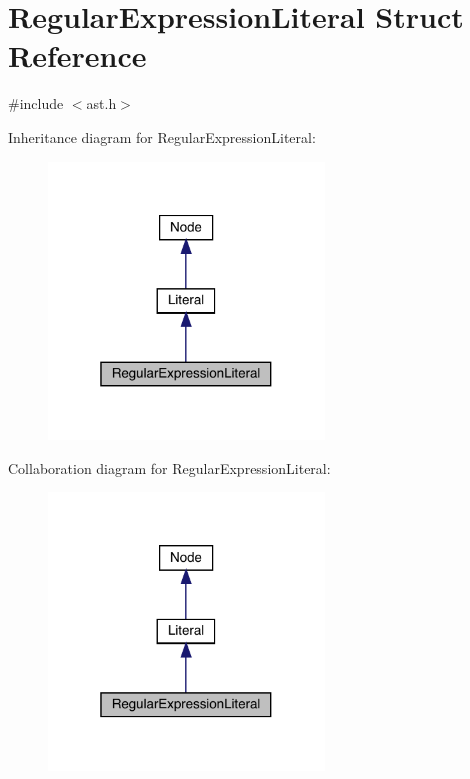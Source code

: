 \hypertarget{struct_regular_expression_literal}{}\section{Regular\+Expression\+Literal Struct Reference}
\label{struct_regular_expression_literal}


{\ttfamily \#include $<$ast.\+h$>$}



Inheritance diagram for Regular\+Expression\+Literal\+:
\nopagebreak
\begin{figure}[H]
\begin{center}
\leavevmode
\includegraphics[width=208pt]{struct_regular_expression_literal__inherit__graph}
\end{center}
\end{figure}


Collaboration diagram for Regular\+Expression\+Literal\+:
\nopagebreak
\begin{figure}[H]
\begin{center}
\leavevmode
\includegraphics[width=208pt]{struct_regular_expression_literal__coll__graph}
\end{center}
\end{figure}
